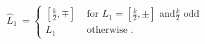 \begin{equation}\label{defofhat}
\hat{L}_{1}\ = \left\{\begin{array}{cl}
[\frac{k}{2},\mp] & \text{ for } L_{1}=[\frac{k}{2},\pm] \text{ and
$\frac{k}{2}$ odd}\\
L_{1} & \text{ otherwise .}
\end{array} \right.
\end{equation}

